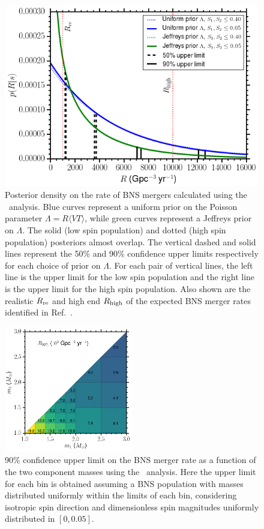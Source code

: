 \begin{figure}[t]
   \centering
   \includegraphics[width=\columnwidth]{figure3.png} 
   \caption{Posterior density on the rate of \ac{BNS} mergers calculated using the \pycbc\ analysis.
   Blue curves represent
   a uniform prior on the Poisson parameter $\Lambda = R \langle VT \rangle$, while
   green curves represent a Jeffreys prior on $\Lambda$. The solid (low spin population)
   and dotted (high spin population) posteriors almost overlap. The vertical dashed and
   solid lines represent the 50\% and 90\% confidence upper limits respectively for each
   choice of prior on $\Lambda$. For each pair of vertical lines, the left line is the 
   upper limit for the low spin population and the right line is the upper limit for the high
   spin population. Also shown are the realistic $R_{\rm re}$ and high end
   $R_{\rm high}$ of the expected \ac{BNS} merger rates identified in Ref.~\citep{Abadie:2010cf}.}
   \label{fig:bnspdf}
\end{figure}

\begin{figure}[t]
\centering
\includegraphics[width=0.5\textwidth]{figure4.png}
\caption{\label{fig:bns_ul_vs_mass} 90\% confidence upper limit on the \ac{BNS} merger rate as a function of the two component
masses using the \pycbc\ analysis. Here the upper limit for each bin is obtained assuming a \ac{BNS} population with masses distributed uniformly
within the limits of each bin, considering isotropic spin direction and dimensionless spin magnitudes uniformly
distributed in $[0, 0.05]$.}
\end{figure}


